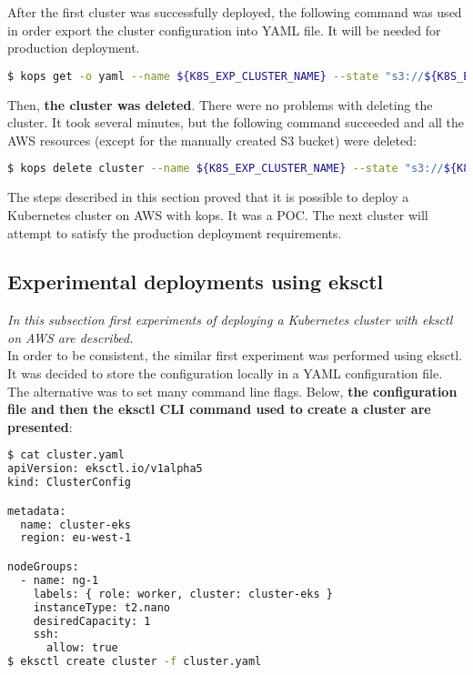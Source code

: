 After the first cluster was successfully deployed, the following command was used in order export the cluster configuration into YAML file. It will be needed for production deployment.
\begin{lstlisting}[basicstyle=\tiny,caption={Command used to export a Kubernetes cluster configuration},captionpos=b,language=Bash,xleftmargin=1cm]
$ kops get -o yaml --name ${K8S_EXP_CLUSTER_NAME} --state "s3://${K8S_EXP_KOPS_S3_BUCKET}"
\end{lstlisting}

Then, \textbf{the cluster was deleted}. There were no problems with deleting the cluster. It took several minutes, but the following command succeeded and all the AWS resources (except for the manually created S3 bucket) were deleted:

\begin{lstlisting}[basicstyle=\tiny,caption={Command used to delete a Kubernetes cluster created with Kops},captionpos=b,language=Bash,xleftmargin=1cm]
$ kops delete cluster --name ${K8S_EXP_CLUSTER_NAME} --state "s3://${K8S_EXP_KOPS_S3_BUCKET}" --yes
\end{lstlisting}

The steps described in this section proved that it is possible to deploy a Kubernetes cluster on AWS with kops. It was a POC. The next cluster will attempt to satisfy the production deployment requirements.


\subsection{Experimental deployments using eksctl}
\textit{In this subsection first experiments of deploying a Kubernetes cluster with eksctl on AWS are described.}
\\

In order to be consistent, the similar first experiment was performed using eksctl. It was decided to store the configuration locally in a YAML configuration file. The alternative was to set many command line flags. Below, \textbf{the configuration file and then the eksctl CLI command used to create a cluster are presented}:
\begin{lstlisting}[basicstyle=\tiny,caption={Commands used to create a cluster with eksctl, without prerequisite steps performed},captionpos=b,language=Bash,xleftmargin=1cm]
$ cat cluster.yaml
apiVersion: eksctl.io/v1alpha5
kind: ClusterConfig

metadata:
  name: cluster-eks
  region: eu-west-1

nodeGroups:
  - name: ng-1
    labels: { role: worker, cluster: cluster-eks }
    instanceType: t2.nano
    desiredCapacity: 1
    ssh:
      allow: true
$ eksctl create cluster -f cluster.yaml
\end{lstlisting}

